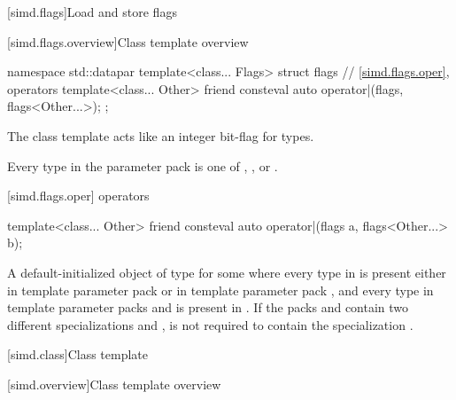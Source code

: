 [simd.flags]{Load and store flags}

[simd.flags.overview]{Class template  overview}

\begin{codeblock}
namespace std::datapar {
  template<class... Flags> struct flags {
    // \ref{simd.flags.oper},  operators
    template<class... Other>
      friend consteval auto operator|(flags, flags<Other...>);
  };
}
\end{codeblock}

\pnum
\begin{note}
The class template  acts like an integer bit-flag for types.
\end{note}

\pnum
\constraints
Every type in the parameter pack  is one of ,
, or .

[simd.flags.oper]{ operators}

\begin{itemdecl}
template<class... Other>
  friend consteval auto operator|(flags a, flags<Other...> b);
\end{itemdecl}

\begin{itemdescr}
\pnum
\returns
  A default-initialized object of type  for some
   where every type in  is present either in template parameter pack
   or in template parameter pack , and every type in template parameter
  packs  and  is present in .
  If the packs  and  contain two
  different specializations  and
  ,  is not required to contain the
  specialization .
\end{itemdescr}

[simd.class]{Class template }

[simd.overview]{Class template  overview}

